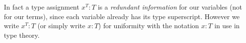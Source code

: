 \begin{definition}
\begin{enumerate}
%
%

\end{enumerate}
\end{definition}

In fact a type assignment $x^T:T$ is a \emph{redundant information} for our
variables (not for our terms), 
since each variable already has its type superscript.
However we write $x^T:T$ (or simply write $x:T$)
for uniformity with the notation $x:T$ in use in type theory.







